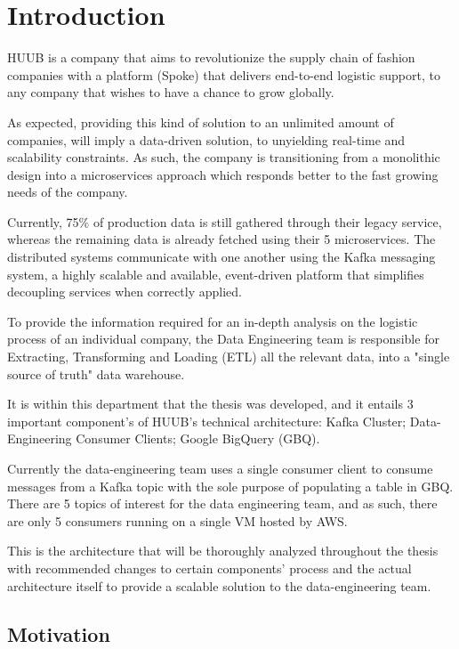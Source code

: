 \chapter{Introduction} \label{chap:intro}

HUUB is a company that aims to revolutionize the supply chain of fashion companies with a platform (Spoke) that delivers end-to-end logistic support, to any company that wishes to have a chance to grow globally.

As expected, providing this kind of solution to an unlimited amount of companies, will imply a data-driven solution, to unyielding real-time and scalability constraints. As such, the company is transitioning from a monolithic design into a microservices approach which responds better to the fast growing needs of the company.

Currently, 75\% of production data is still gathered through their legacy service, whereas the remaining data is already fetched using their 5 microservices. The distributed systems communicate with one another using the Kafka messaging system, a highly scalable and available, event-driven platform that simplifies decoupling services when correctly applied.

To provide the information required for an in-depth analysis on the logistic process of an individual company, the Data Engineering team is responsible for Extracting, Transforming and Loading (ETL) all the relevant data, into a "single source of truth" data warehouse.

It is within this department that the thesis was developed, and it entails 3 important component's of HUUB's technical architecture: Kafka Cluster; Data-Engineering Consumer Clients; Google BigQuery (GBQ).

Currently the data-engineering team uses a single consumer client to consume messages from a Kafka topic with the sole purpose of populating a table in GBQ. There are 5 topics of interest for the data engineering team, and as such, there are only 5 consumers running on a single VM hosted by AWS.

This is the architecture that will be thoroughly analyzed throughout the thesis with recommended changes to certain components' process and the actual architecture itself to provide a scalable solution to the data-engineering team.

\section{Motivation} \label{sec:motivation}

